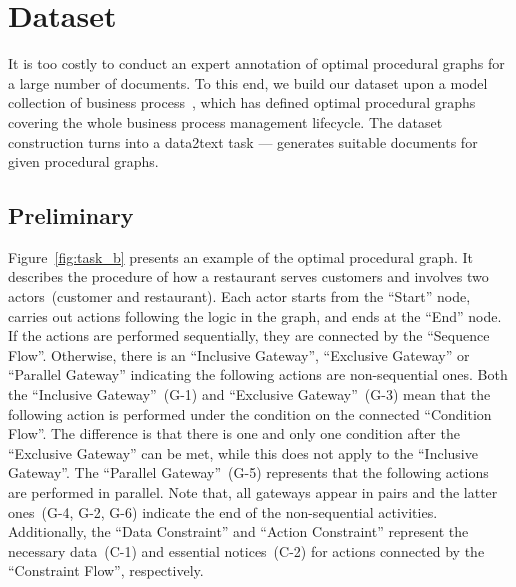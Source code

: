 

\section{Dataset
}

\label{sec:data}
It is too costly to conduct an expert annotation of optimal procedural graphs for a large number of documents. To this end, we build our dataset upon a model collection of business process~\cite{dumas2018fundamentals}, which has defined optimal procedural graphs covering the whole business process management lifecycle. The dataset construction turns into a data2text task --- generates suitable documents for given procedural graphs.


\subsection{Preliminary
}

Figure~\ref{fig:task_b} presents an example of the optimal procedural graph. It describes the procedure of how a restaurant serves customers and involves two actors~(customer and restaurant).
Each actor starts from the ``Start'' node, carries out actions following the logic in the graph, and ends at the ``End'' node. If the actions are performed sequentially, they are connected by the ``Sequence Flow''. Otherwise, there is an ``Inclusive Gateway'', ``Exclusive Gateway'' or ``Parallel Gateway'' indicating the following actions are non-sequential ones. Both the ``Inclusive Gateway''~(G-1) and ``Exclusive Gateway''~(G-3) mean that the following action is performed under the condition on the connected ``Condition Flow''. The difference is that there is one and only one condition after the ``Exclusive Gateway'' can be met, while this does not apply to the ``Inclusive Gateway''. The ``Parallel Gateway''~(G-5) represents that the following actions are performed in parallel. Note that, all gateways appear in pairs and the latter ones~(G-4, G-2, G-6) indicate the end of the non-sequential activities. Additionally, the ``Data Constraint'' and ``Action Constraint'' represent the necessary data~(C-1) and essential notices~(C-2) for actions connected by the ``Constraint Flow'', respectively.

